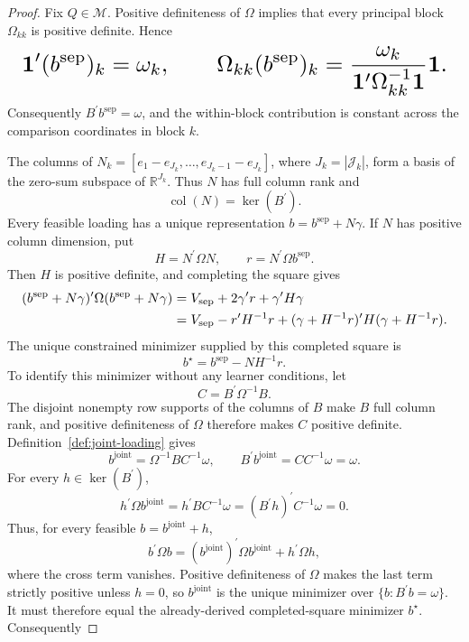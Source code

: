 \documentclass{article}
\begin{document}
\begin{proof}
Fix \(Q\in\mathcal M\). Positive definiteness of \(\Omega\) implies that every principal block \(\Omega_{kk}\) is positive definite. Hence
\[
\makebox[\linewidth][c]{\resizebox{0.98\linewidth}{!}{\(\displaystyle \mathbf 1^{\prime}(b^{\mathrm{sep}})_k=\omega_k,
 \qquad
 \Omega_{kk}(b^{\mathrm{sep}})_k
 =\frac{\omega_k}{\mathbf 1^{\prime}\Omega_{kk}^{-1}\mathbf 1}
 \mathbf 1.\)}}
\]
Consequently \(B^{\prime}b^{\mathrm{sep}}=\omega\), and the within-block contribution is constant across the comparison coordinates in block \(k\).

The columns of \(N_k=[e_1-e_{J_k},\ldots,e_{J_k-1}-e_{J_k}]\), where \(J_k=|\mathcal J_k|\), form a basis of the zero-sum subspace of \(\mathbb R^{J_k}\). Thus \(N\) has full column rank and
\[
 \operatorname{col}(N)=\ker(B^{\prime}).
\]
Every feasible loading has a unique representation \(b=b^{\mathrm{sep}}+N\gamma\). If \(N\) has positive column dimension, put
\[
 H=N^{\prime}\Omega N,
 \qquad
 r=N^{\prime}\Omega b^{\mathrm{sep}}.
\]
Then \(H\) is positive definite, and completing the square gives
\[
\makebox[\linewidth][c]{\resizebox{0.98\linewidth}{!}{\(\displaystyle \begin{aligned}
 (b^{\mathrm{sep}}+N\gamma)^{\prime}\Omega
 (b^{\mathrm{sep}}+N\gamma)
 &=V_{\mathrm{sep}}+2\gamma^{\prime}r+
 \gamma^{\prime}H\gamma\\
 &=V_{\mathrm{sep}}-r^{\prime}H^{-1}r
 +(\gamma+H^{-1}r)^{\prime}H(\gamma+H^{-1}r).
\end{aligned}\)}}
\]
The unique constrained minimizer supplied by this completed square is
\[
 b^{\star}=b^{\mathrm{sep}}-NH^{-1}r.
\]
To identify this minimizer without any learner conditions, let
\[
 C=B^{\prime}\Omega^{-1}B.
\]
The disjoint nonempty row supports of the columns of \(B\) make \(B\) full column rank, and positive definiteness of \(\Omega\) therefore makes \(C\) positive definite. Definition~\ref{def:joint-loading} gives
\[
 b^{\mathrm{joint}}=\Omega^{-1}BC^{-1}\omega,
 \qquad
 B^{\prime}b^{\mathrm{joint}}=CC^{-1}\omega=\omega.
\]
For every \(h\in\ker(B^{\prime})\),
\[
 h^{\prime}\Omega b^{\mathrm{joint}}
 =h^{\prime}BC^{-1}\omega
 =(B^{\prime}h)^{\prime}C^{-1}\omega=0.
\]
Thus, for every feasible \(b=b^{\mathrm{joint}}+h\),
\[
 b^{\prime}\Omega b
 =(b^{\mathrm{joint}})^{\prime}\Omega b^{\mathrm{joint}}
 +h^{\prime}\Omega h,
\]
where the cross term vanishes. Positive definiteness of \(\Omega\) makes the last term strictly positive unless \(h=0\), so \(b^{\mathrm{joint}}\) is the unique minimizer over \(\{b:B^{\prime}b=\omega\}\). It must therefore equal the already-derived completed-square minimizer \(b^{\star}\). Consequently

\end{proof}
\end{document}
